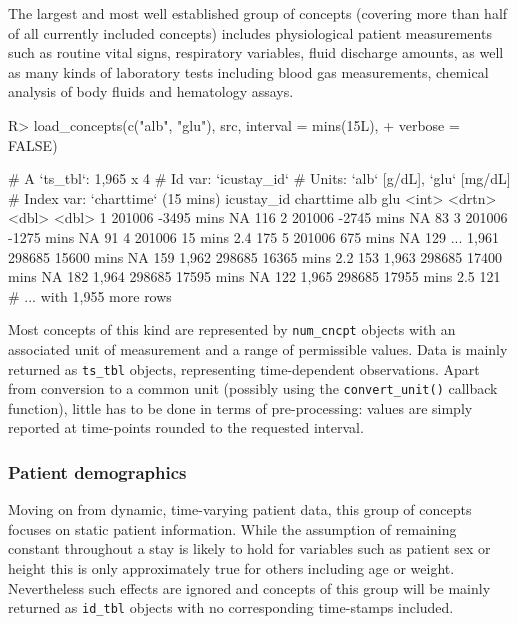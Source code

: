\documentclass[
  notitle]{jss}
\begin{document}
The largest and most well established group of concepts (covering more
than half of all currently included concepts) includes physiological
patient measurements such as routine vital signs, respiratory variables,
fluid discharge amounts, as well as many kinds of laboratory tests
including blood gas measurements, chemical analysis of body fluids and
hematology assays.

\begin{CodeChunk}
\begin{CodeInput}
R> load_concepts(c("alb", "glu"), src, interval = mins(15L),
+               verbose = FALSE)
\end{CodeInput}
\begin{CodeOutput}
# A `ts_tbl`: 1,965 x 4
# Id var:     `icustay_id`
# Units:      `alb` [g/dL], `glu` [mg/dL]
# Index var:  `charttime` (15 mins)
      icustay_id charttime    alb   glu
           <int> <drtn>     <dbl> <dbl>
    1     201006 -3495 mins  NA     116
    2     201006 -2745 mins  NA      83
    3     201006 -1275 mins  NA      91
    4     201006    15 mins   2.4   175
    5     201006   675 mins  NA     129
  ...
1,961     298685 15600 mins  NA     159
1,962     298685 16365 mins   2.2   153
1,963     298685 17400 mins  NA     182
1,964     298685 17595 mins  NA     122
1,965     298685 17955 mins   2.5   121
# ... with 1,955 more rows
\end{CodeOutput}
\end{CodeChunk}

Most concepts of this kind are represented by \texttt{num\_cncpt}
objects with an associated unit of measurement and a range of
permissible values. Data is mainly returned as \texttt{ts\_tbl} objects,
representing time-dependent observations. Apart from conversion to a
common unit (possibly using the \texttt{convert\_unit()} callback
function), little has to be done in terms of pre-processing: values are
simply reported at time-points rounded to the requested interval.

\hypertarget{patient-demographics}{%
\subsubsection{Patient demographics}\label{patient-demographics}}

Moving on from dynamic, time-varying patient data, this group of
concepts focuses on static patient information. While the assumption of
remaining constant throughout a stay is likely to hold for variables
such as patient sex or height this is only approximately true for others
including age or weight. Nevertheless such effects are ignored and
concepts of this group will be mainly returned as \texttt{id\_tbl}
objects with no corresponding time-stamps included.
\end{document}
